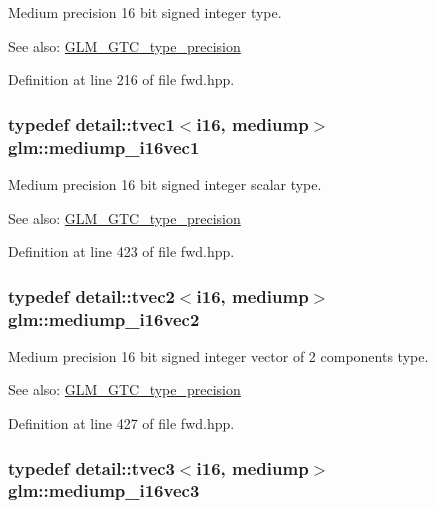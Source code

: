 Medium precision 16 bit signed integer type. \begin{Desc}
\item[See also:]\hyperlink{group__gtc__type__precision}{GLM\_\-GTC\_\-type\_\-precision} \end{Desc}


Definition at line 216 of file fwd.hpp.\hypertarget{group__gtc__type__precision_g6a1d37139ea8990de24edf4bfa3500ad}{
\subsubsection[mediump\_\-i16vec1]{\setlength{\rightskip}{0pt plus 5cm}typedef detail::tvec1$<$i16, mediump$>$ {\bf glm::mediump\_\-i16vec1}}}
\label{group__gtc__type__precision_g6a1d37139ea8990de24edf4bfa3500ad}


Medium precision 16 bit signed integer scalar type. \begin{Desc}
\item[See also:]\hyperlink{group__gtc__type__precision}{GLM\_\-GTC\_\-type\_\-precision} \end{Desc}


Definition at line 423 of file fwd.hpp.\hypertarget{group__gtc__type__precision_g664a0266910df3c2d6559651f94d32e6}{
\subsubsection[mediump\_\-i16vec2]{\setlength{\rightskip}{0pt plus 5cm}typedef detail::tvec2$<$i16, mediump$>$ {\bf glm::mediump\_\-i16vec2}}}
\label{group__gtc__type__precision_g664a0266910df3c2d6559651f94d32e6}


Medium precision 16 bit signed integer vector of 2 components type. \begin{Desc}
\item[See also:]\hyperlink{group__gtc__type__precision}{GLM\_\-GTC\_\-type\_\-precision} \end{Desc}


Definition at line 427 of file fwd.hpp.\hypertarget{group__gtc__type__precision_gd9e470f707da812fe454505c99035471}{
\subsubsection[mediump\_\-i16vec3]{\setlength{\rightskip}{0pt plus 5cm}typedef detail::tvec3$<$i16, mediump$>$ {\bf glm::mediump\_\-i16vec3}}}
\label{group__gtc__type__precision_gd9e470f707da812fe454505c99035471}


